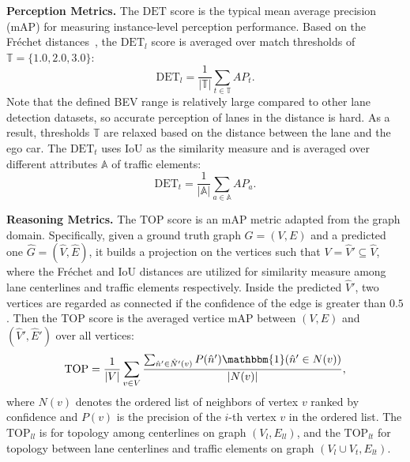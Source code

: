 \smallskip
\noindent
\textbf{Perception Metrics.}
The $\text{DET}$ score is the typical mean average precision (mAP) for measuring instance-level perception performance.
Based on the Fr\'echet distances~\cite{eiter1994frechet}, the $\text{DET}_{l}$ score is averaged over match thresholds of $\mathbb{T} = \{1.0, 2.0, 3.0\}$:
\begin{equation}
    \text{DET}_{l} = \frac{1}{|\mathbb{T}|} \sum_{t \in \mathbb{T}} AP_t.
\end{equation}
Note that the defined BEV range is relatively large compared to other lane detection datasets, so accurate perception of lanes in the distance is hard. 
As a result, thresholds $\mathbb{T}$ are relaxed based on the distance between the lane and the ego car.
The $\text{DET}_{t}$ uses IoU as the similarity measure and is averaged over different attributes $\mathbb{A}$ of traffic elements:
\begin{equation}
    \text{DET}_{t} = \frac{1}{|\mathbb{A}|} \sum_{a \in \mathbb{A}} AP_a.
\end{equation}


\smallskip
\noindent
\textbf{Reasoning Metrics.}
The $\text{TOP}$ score is an mAP metric adapted from the graph domain.
Specifically, given a ground truth graph $G = (V, E)$ and a predicted one $\hat{G} = (\hat{V}, \hat{E})$, it builds a projection on the vertices such that $V = \hat{V}' \subseteq \hat{V}$, where the Fr\'{e}chet and IoU distances are utilized for similarity measure among lane centerlines and traffic elements respectively.
Inside the predicted $ \hat{V}'$, two vertices are regarded as connected if the confidence of the edge is greater than $0.5$.
Then the TOP score is the averaged vertice mAP between $(V, E)$ and $(\hat{V}', \hat{E}')$ over all vertices:
\begin{equation}
    \text{TOP} = \frac{1}{|V|} \sum_{v \in V} \frac{\sum_{\hat{n}' \in \hat{N}'(v)} P(\hat{n}') \mathbbm{1}(\hat{n}' \in N(v))}{|N(v)|},
\end{equation}
where $N(v)$ denotes the ordered list of neighbors of vertex $v$ ranked by confidence and $P(v)$ is the precision of the $i$-th vertex $v$ in the ordered list.
The $\text{TOP}_{ll}$ is for topology among centerlines on graph $(V_{l}, E_{ll})$, and the $\text{TOP}_{lt}$ for topology between lane centerlines and traffic elements on graph $(V_{l} \cup V_{t}, E_{lt})$.


